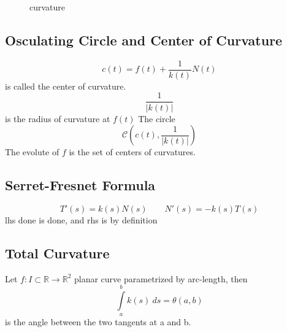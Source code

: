 \begin{figure}[ht]
    \centering
    \caption{curvature}
    \label{fig:curvature}
\end{figure}








\subsection{Osculating Circle and Center of Curvature}
\label{subsec:Osculating Circle and Center of Curvature}
\begin{defn}[]
    \[
        c(t) = f(t) + \frac{ 1 }{ k(t) } N(t) 
    \]
    is called the center of curvature. 
    \[
        \frac{ 1 }{ \left | k(t) \right |  } 
    \]
    is the radius of curvature at $ f(t) $
    The circle 
    \[
        \mathscr{ C } \left( c(t), \frac{ 1 }{ \left | k(t) \right |  } \right) 
    \]
    The evolute of $ f $ is the set of centers of curvatures.
\end{defn}


\subsection{Serret-Fresnet Formula}
\label{subsec:Serret-Fresnet Formula}
\begin{prop}[]
    \[
        T'(s) = k(s)N(s) \qquad N'(s) = -k(s)T(s)  
    \]
    lhs done is done, and rhs is by definition 
\end{prop}

\subsection{Total Curvature}
\label{subsec:Total Curvature}

\begin{ftheo}
    Let $ f: I \subset \mathbb{R}\to \mathbb{R}^2 $ planar curve parametrized by
    arc-length, then 
    \[
        \int\limits_{a}^{b} k(s) \ ds = \theta(a,b)
    \]
    is the angle between the two tangents at a and b.
    \label{th:Total Curvature}
\end{ftheo}


